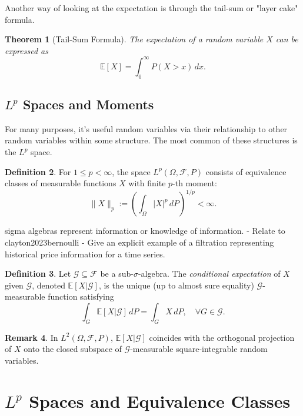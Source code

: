 \documentclass[11pt,reqno]{amsart}
\newtheorem{theorem}{Theorem}[section]
\theoremstyle{definition}
\newtheorem{definition}[theorem]{Definition}
\newtheorem{remark}[theorem]{Remark}
\theoremstyle{remark}
\begin{document}
Another way of looking at the expectation is through the tail-sum or "layer cake" formula.

\begin{theorem}[Tail-Sum Formula]
	The expectation of a random variable $X$ can be expressed as
	\[
		\mathbb{E}[X] = \int_0^\infty P(X > x) \, dx.
	\]
\end{theorem}



\subsection{\(L^p\) Spaces and Moments}

For many purposes, it's useful random variables via their relationship to other random variables within some structure. The most common of these structures is the \(L^p\) space.

\begin{definition}
	For $1 \leq p < \infty$, the space $L^p(\Omega, \mathcal{F}, P)$ consists of equivalence classes of measurable functions $X$ with finite $p$-th moment:
	\[
		\|X\|_p := \left( \int_\Omega |X|^p \, dP \right)^{1/p} < \infty.
	\]
\end{definition}



sigma algebras represent information or knowledge of information.
- Relate to clayton2023bernoulli
- Give an explicit example of a filtration representing historical price information for a time series.

\begin{definition}
	Let $\mathcal{G} \subseteq \mathcal{F}$ be a sub-$\sigma$-algebra. The \emph{conditional expectation} of $X$ given $\mathcal{G}$, denoted $\mathbb{E}[X|\mathcal{G}]$, is the unique (up to almost sure equality) $\mathcal{G}$-measurable function satisfying
	\[
		\int_G \mathbb{E}[X|\mathcal{G}] \, dP = \int_G X \, dP, \quad \forall G \in \mathcal{G}.
	\]
\end{definition}

\begin{remark}
	In $L^2(\Omega, \mathcal{F}, P)$, $\mathbb{E}[X|\mathcal{G}]$ coincides with the orthogonal projection of $X$ onto the closed subspace of $\mathcal{G}$-measurable square-integrable random variables.
\end{remark}

\section{\texorpdfstring{$L^p$}{Lp} Spaces and Equivalence Classes}
\end{document}
